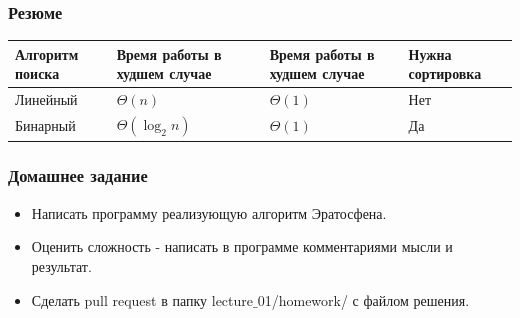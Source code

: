 \documentclass[russian, 12pt]{beamer}
\begin{document}
\begin{frame}
  \frametitle{Резюме}
  \renewcommand{\arraystretch}{1}
\begin{center}
  \begin{tabular}{  m{1.9cm\centering} | m{3cm\centering}| m{3cm\centering} | m{2cm\centering} } 
    Алгоритм поиска & Время работы в худшем случае  & Время работы в худшем случае & Нужна \newline сортировка \\ 
    \hline
    Линейный & $\Theta(n)$ & $\Theta(1)$ & Нет \\
    
    Бинарный &  $\Theta(\log_2n)$  & $\Theta(1)$ & Да\\ 
  
  \end{tabular}
\end{center}
\end{frame}
\begin{frame}
\frametitle{Домашнее задание}
\begin{itemize}
  \item Написать программу реализующую алгоритм Эратосфена.
  \item Оценить сложность - написать в программе комментариями мысли и результат.
  \item Сделать pull request в папку lecture$\_$01/homework/ с файлом решения.
\end{itemize}
\end{frame}
\end{document}
